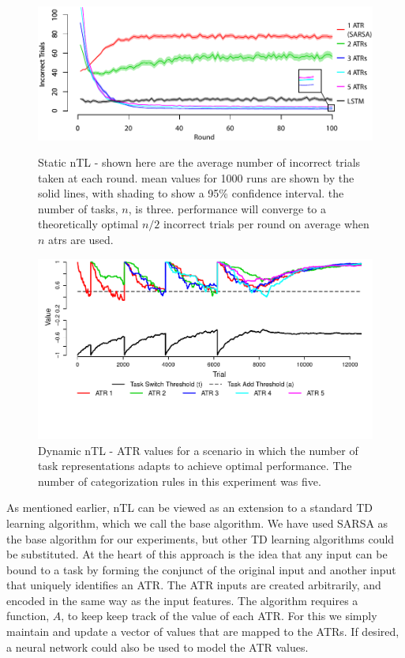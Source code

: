 \documentclass[10pt,letterpaper]{article}
\begin{document}
\begin{figure}[t!]
    \centering
    \begin{minipage}{0.48\textwidth}
        \centering
        \includegraphics[scale=.53]{images/task_performance.pdf}
        \caption[]{Static nTL - shown here are the average number of incorrect trials taken at each round. mean values for 1000 runs are shown by the solid lines, with shading to show a 95\% confidence interval. the number of tasks, $n$, is three. performance will converge to a theoretically optimal $ n/2 $ incorrect trials per round on average when $ n $ atrs are used.}
        \label{fig:task_performance}
    \end{minipage}\hfill
    \begin{minipage}{0.48\textwidth}
        \centering
          \includegraphics[scale=.53]{images/learn_num_tasks.pdf}
          \caption[]{Dynamic nTL - ATR values for a scenario in which the number of task representations adapts to achieve optimal performance. The number of categorization rules in this experiment was five.}
          \label{fig:learn_num_tasks}
    \end{minipage}\hfill
\end{figure}
        
As mentioned earlier, nTL can be viewed as an extension to a standard TD learning algorithm, which we call the base algorithm. We have used SARSA as the base algorithm for our experiments, but other TD learning algorithms could be substituted. At the heart of this approach is the idea that any input can be bound to a task by forming the conjunct of the original input and another input that uniquely identifies an ATR. The ATR inputs are created arbitrarily, and encoded in the same way as the input features. The algorithm requires a function, $A$, to keep keep track of the value of each ATR. For this we simply maintain and update a vector of values that are mapped to the ATRs. If desired, a neural network could also be used to model the ATR values.
   
\end{document}

